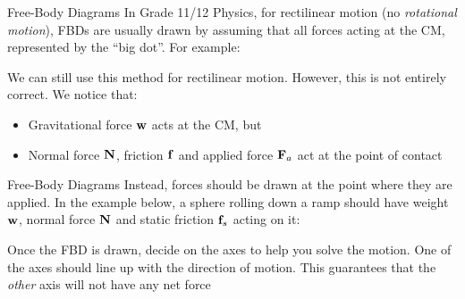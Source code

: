 \documentclass[12pt,compress,aspectratio=169]{beamer}
\newcommand{\mb}[1]{\ensuremath\mathbf{#1}}
\begin{document}
\begin{frame}{Free-Body Diagrams}
  In Grade 11/12 Physics, for rectilinear motion (no \emph{rotational motion}),
  FBDs are usually drawn by assuming that all forces acting at the CM,
  represented by the ``big dot''. For example:
  \begin{center}
    \vspace{-.15in}
  \end{center}
  \vspace{-.1in}We can still use this method for rectilinear motion. However,
  this is not entirely correct. We notice that:
  \begin{itemize}
  \item Gravitational force $\mb{w}$ acts at the CM, but
  \item Normal force $\mb{N}$, friction $\mb{f}$ and applied force $\mb{F}_a$
    act at the point of contact
  \end{itemize}
\end{frame}



\begin{frame}{Free-Body Diagrams}
  Instead, forces should be drawn at the point where they are applied. In the
  example below, a sphere rolling down a ramp should have weight $\mb{w}$,
  normal force $\mb{N}$ and static friction $\mb{f}_s$ acting on it:
  \begin{center}
  \end{center}
  Once the FBD is drawn, decide on the axes to help you solve the motion. One of
  the axes should line up with the direction of motion. This guarantees that the 
  \emph{other} axis will not have any net force
\end{frame}
\end{document}
